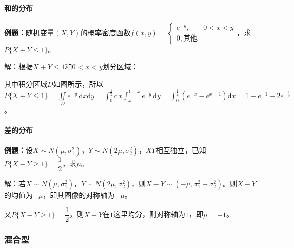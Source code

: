 \documentclass[UTF8, 12pt]{ctexart}
\begin{document}
\paragraph{和的分布} \leavevmode \medskip

\textbf{例题：}随机变量$(X,Y)$的概率密度函数$f(x,y)=\left\{\begin{array}{ll}
    e^{-y}, & 0<x<y \\
    0, \text{其他}
\end{array}\right.$，求$P\{X+Y\leqslant1\}$。

解：根据$X+Y\leqslant1$和$0<x<y$划分区域：

\begin{multicols}{2}
    

    其中积分区域$D$如图所示，所以$P\{X+Y\leqslant1\}=\iint\limits_De^{-y}\,\textrm{d}x\textrm{d}y=\int_0^{\frac{1}{2}}\textrm{d}x\int_x^{1-x}e^{-y}\,\textrm{d}y=\int_0^{\frac{1}{2}}(e^{-x}-e^{x-1})\textrm{d}x=1+e^{-1}-2e^{-\frac{1}{2}}$。

\end{multicols}

\paragraph{差的分布} \leavevmode \medskip

\textbf{例题：}设$X\sim N(\mu,\sigma_1^2)$，$Y\sim N(2\mu,\sigma_2^2)$，$XY$相互独立，已知$P\{X-Y\geqslant1\}=\dfrac{1}{2}$，求$\mu$。

解：若$X\sim N(\mu,\sigma_1^2)$，$Y\sim N(2\mu,\sigma_2^2)$，则$X-Y\sim(-\mu,\sigma_1^2-\sigma_2^2)$。则$X-Y$的均值为$-\mu$，即其图像的对称轴为$-\mu$。

又$P\{X-Y\geqslant1\}=\dfrac{1}{2}$，则$X-Y$在$1$这里均分，则对称轴为$1$，即$\mu=-1$。

\subsubsection{混合型}
\end{document}
